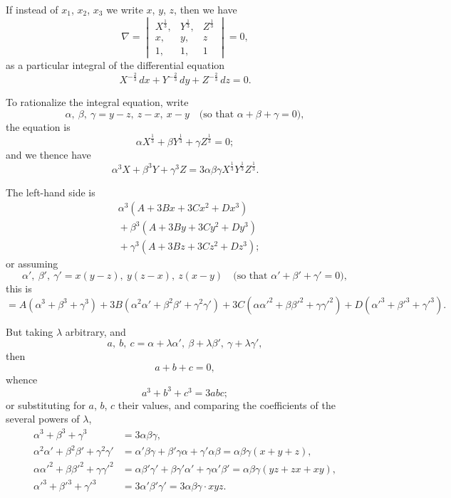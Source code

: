 \documentclass[11pt,a4paper]{book}
\begin{document}
If instead of $x_1$, $x_2$, $x_3$ we write $x$, $y$, $z$, then we have
\[
\nabla = \begin{vmatrix}
X^{\frac{1}{3}}, & Y^{\frac{1}{3}}, & Z^{\frac{1}{3}} \\
x, & y, & z \\
1, & 1, & 1
\end{vmatrix} = 0,
\]
as a particular integral of the differential equation
\[
X^{-\frac{2}{3}}\,dx + Y^{-\frac{2}{3}}\,dy + Z^{-\frac{2}{3}}\,dz = 0.
\]

To rationalize the integral equation, write
\[
\alpha,\ \beta,\ \gamma = y-z,\ z-x,\ x-y \quad \text{(so that $\alpha+\beta+\gamma=0$)},
\]
the equation is
\[
\alpha X^{\frac{1}{3}} + \beta Y^{\frac{1}{3}} + \gamma Z^{\frac{1}{3}} = 0;
\]
and we thence have
\[
\alpha^3 X + \beta^3 Y + \gamma^3 Z = 3\alpha\beta\gamma X^{\frac{1}{3}}Y^{\frac{1}{3}}Z^{\frac{1}{3}}.
\]

The left-hand side is
\begin{align*}
&\alpha^3 (A + 3Bx + 3Cx^2 + Dx^3) \\
&{}+ \beta^3 (A + 3By + 3Cy^2 + Dy^3) \\
&{}+ \gamma^3 (A + 3Bz + 3Cz^2 + Dz^3);
\end{align*}
or assuming
\[
\alpha',\ \beta',\ \gamma' = x(y-z),\ y(z-x),\ z(x-y) \quad \text{(so that $\alpha'+\beta'+\gamma'=0$)},
\]
this is
\[
= A(\alpha^3+\beta^3+\gamma^3) + 3B(\alpha^2\alpha'+\beta^2\beta'+\gamma^2\gamma')
+ 3C(\alpha\alpha'^2+\beta\beta'^2+\gamma\gamma'^2) + D(\alpha'^3+\beta'^3+\gamma'^3).
\]

But taking $\lambda$ arbitrary, and
\[
a,\ b,\ c = \alpha+\lambda\alpha',\ \beta+\lambda\beta',\ \gamma+\lambda\gamma',
\]
then
\[
a+b+c=0,
\]
whence
\[
a^3+b^3+c^3 = 3abc;
\]
or substituting for $a$, $b$, $c$ their values, and comparing the coefficients of the several powers of $\lambda$,
\begin{align*}
\alpha^3+\beta^3+\gamma^3 &= 3\alpha\beta\gamma, \\
\alpha^2\alpha'+\beta^2\beta'+\gamma^2\gamma'
&= \alpha'\beta\gamma + \beta'\gamma\alpha + \gamma'\alpha\beta
= \alpha\beta\gamma(x+y+z), \\
\alpha\alpha'^2+\beta\beta'^2+\gamma\gamma'^2
&= \alpha\beta'\gamma' + \beta\gamma'\alpha' + \gamma\alpha'\beta'
= \alpha\beta\gamma(yz+zx+xy), \\
\alpha'^3+\beta'^3+\gamma'^3 &= 3\alpha'\beta'\gamma' = 3\alpha\beta\gamma\cdot xyz.
\end{align*}
\end{document}
